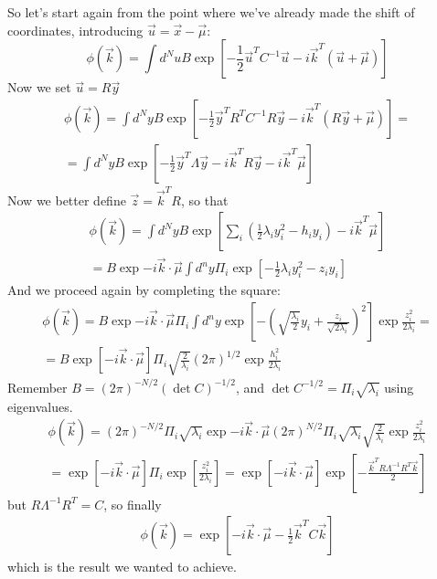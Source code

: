 \documentclass[a4paper,11pt,fleqn]{article}
\begin{document}
So let's start again from the point where we've already made the shift of 
coordinates, introducing $\vec{u} = \vec{x}-\vec{\mu}$:
\begin{equation*}
    \phi(\vec{k})= \int d^N u B \exp{\left[ -\frac{1}{2}\vec{u}^TC^{-1}\vec{u} - i\vec{k}^T(\vec{u}+\vec{\mu}) \right]}
\end{equation*}
Now we set $\vec{u} = R\vec{y}$
\begin{gather*}
    \phi(\vec{k})= \int d^N y B \exp{\left[ -\frac{1}{2}\vec{y}^T R^T C^{-1} R\vec{y} - i\vec{k}^T(R\vec{y}+\vec{\mu}) \right]} = \\
    = \int d^N y B \exp{\left[ -\frac{1}{2}\vec{y}^T \Lambda \vec{y} - i\vec{k}^T R \vec{y} -i \vec{k}^T\vec{\mu} \right]}
\end{gather*}
Now we better define $\vec{z} = \vec{k}^T R$, so that 
\begin{gather*}
    \phi(\vec{k})= \int d^N y B \exp{\left[ \sum_i(\frac{1}{2}\lambda_iy_i^2-h_iy_i) -i \vec{k}^T\vec{\mu} \right]} \\
    = B \exp{-i\vec{k}\cdot \vec{\mu}} \int d^ny \Pi_i \exp{\left[-\frac{1}{2}\lambda_i y_i^2 -z_i y_i\right]}  
\end{gather*}
And we proceed again by completing the square:
\begin{gather*}
    \phi(\vec{k}) = B \exp{-i\vec{k}\cdot \vec{\mu}} \Pi_i \int d^ny \exp{\left[-\left(\sqrt{\frac{\lambda_i}{2}}y_i + \frac{z_i}{\sqrt{2\lambda_i}}\right)^2 \right]} \exp{\frac{z_i^2}{2\lambda_i}} =  \\
    = B \exp{\left[-i\vec{k}\cdot\vec{\mu} \right]} \Pi_i \sqrt{\frac{2}{\lambda_i}}(2\pi)^{1/2}\exp{\frac{h_i^2}{2\lambda_i}}
\end{gather*}
Remember $B=(2\pi)^{-N/2}(\det{C})^{-1/2}$, and $\det{C}^{-1/2}=\Pi_i\sqrt{\lambda_i}$ using eigenvalues.
\begin{gather*}
    \phi(\vec{k}) = (2\pi)^{-N/2} \Pi_i\sqrt{\lambda_i} \exp{-i\vec{k}\cdot \vec{\mu}} (2\pi)^{N/2} \Pi_i \sqrt{\lambda_i} \sqrt{\frac{2}{\lambda_i}}\exp{\frac{z_i^2}{2\lambda_i}} \\
    = \exp{\left[-i\vec{k}\cdot \vec{\mu}\right]} \Pi_i \exp{\left[\frac{z_i^2}{2\lambda_i}\right]} = \exp{\left[-i\vec{k}\cdot \vec{\mu}\right]} \exp{\left[-\frac{\vec{k}^TR\Lambda^{-1} R^T\vec{k}}{2}\right]}
\end{gather*}
but $R \Lambda^{-1} R^T = C$, so finally 
\begin{gather*}
    \phi(\vec{k}) = \exp{\left[-i\vec{k}\cdot\vec{\mu}-\frac{1}{2}\vec{k}^TC\vec{k}\right]}
\end{gather*}
which is the result we wanted to achieve.
\end{document}
